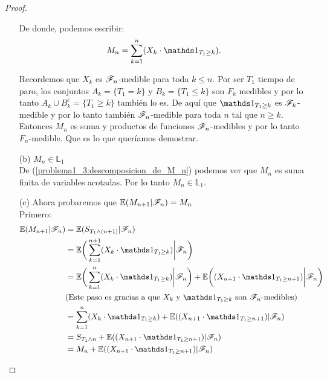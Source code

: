 \begin{proof}
\begin{itemize}
				De donde, podemos escribir:
				\begin{align}\label{problema1_3:descomposicion_de_M_n}
					M_n = \sum_{k=1}^{n} (X_k \cdot \indic_{T_1 \geq k}).
				\end{align}								 		
				
				Recordemos que $X_k$ es $\mathscr{F}_n$-medible para toda $k \leq n $. Por ser
				$T_1$ tiempo de paro, los conjuntos $A_k = \{T_1 = k\}$ y 
				$B_k = \{T_1 \leq k\}$	son $F_k$ medibles y por lo tanto 
				$A_k \cup B_k^c = \{ T_1 \geq k\}$ también lo es. De aquí que 
				$\indic_{T_1 \geq k}$ es $\mathscr{F}_k$-medible y por lo tanto también $\mathscr{F}_n$-medible
				para toda $n$ tal que $n \geq k$.\\
				  
				Entonces $M_n$ es suma y productos de funciones $\mathscr{F}_n$-medibles y por lo tanto
				$F_n$-medible. Que es lo que queríamos demostrar.\\
				
			\item[(b)]
				$M_n \in \mathbb{L}_1$\\
				
				De (\ref{problema1_3:descomposicion_de_M_n}) podemos ver que $M_n$ es 
				suma finita de variables acotadas. Por lo tanto $M_n \in \mathbb{L}_1$.\\
				
			\item[(c)] Ahora probaremos que	$\mathbb{E}(M_{n+1} | \mathscr{F}_{n}) = M_{n}$\\
				
				Primero:
				\begin{align}
					\E(M_{n+1} | \F_{n}) 	&=		\E( S_{T_1 \wedge (n+1)} | \F_{n}) \\ 
											&=		\E\bigg( \sum_{k=1}^{n+1} (X_k \cdot \indic_{T_1 \geq k})\bigg| \F_{n}\bigg) \\	 			
											&=		\E\bigg( \sum_{k=1}^{n} (X_k \cdot \indic_{T_1 \geq k}) \bigg| \F_{n}\bigg) +
													\E\bigg((X_{n+1} \cdot \indic_{T_1 \geq n+1}) \bigg| \F_{n}\bigg) \\
												&\mbox{(Este paso es gracias a que $X_k$ y $\indic_{T_1 \geq k}$ son $\F_n$-medibles)}\\
											& = 	\sum_{k=1}^{n} (X_k \cdot \indic_{T_1 \geq k}) + 
													\E((X_{n+1} \cdot \indic_{T_1 \geq n+1}) | \F_{n}) \\
											& = 	S_{T_1 \wedge n} + \E((X_{n+1} \cdot \indic_{T_1 \geq n+1}) | \F_{n}) \\
											& = 	M_n + \E((X_{n+1} \cdot \indic_{T_1 \geq n+1}) | \F_{n})
				\end{align}
				

\end{itemize}
\end{proof}
